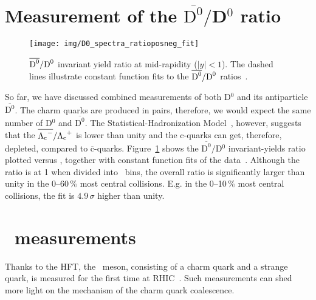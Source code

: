 \section{Measurement of the $\overline{\text{D}^0}/$D$^0$ ratio}

\begin{figure}[!htb]
\begin{center}
 \texttt{[image: img/D0\_spectra\_ratioposneg\_fit]}\\
\end{center}
\caption[$\overline{\dzero}/\dzero$ invariant yield ratio at mid-rapidity ($|y| < 1$).]{\label{dzeroRatio}$\overline{\dzero}/\dzero$ invariant yield ratio at mid-rapidity ($|y| < 1$). The dashed lines illustrate constant function fits to the $\overline{\dzero}/\dzero$ ratios~\cite{D0paper}.}
\end{figure}

So far, we have discussed combined measurements of both D$^0$ and its antiparticle $\overline{\text{D}^0}$\@. The charm quarks are produced in pairs, therefore, we would expect the same number of D$^0$ and $\overline{\text{D}^0}$\@. The Statistical-Hadronization Model~\cite{SHM_LcRatio}, however, suggests that the $\overline{{\Lambda_\text{c}}^-}/{\Lambda_\text{c}}^+$ is lower than unity and the c-quarks can get, therefore, depleted, compared to $\overline{\text{c}}$-quarks. Figure~\ref{dzeroRatio} shows the $\overline{\text{D}^0}/$D$^0$ invariant-yields ratio plotted versus \pt, together with constant function fits of the data~\cite{D0paper}\@.  Although the ratio is at 1 when divided into \pt\ bins, the overall ratio is significantly larger than unity in the 0--60$\,\%$ most central collisions. E.g. in the 0--10$\,\%$ most central collisions, the fit is $4.9\,\sigma$ higher than unity.



\section{\Ds\ measurements}

Thanks to the HFT, the \Ds\ meson, consisting of a charm quark and a strange quark,
is measured for the first time at RHIC~\cite{DsPaper}\@. Such measurements can
shed more light on the mechanism of the charm quark coalescence.

